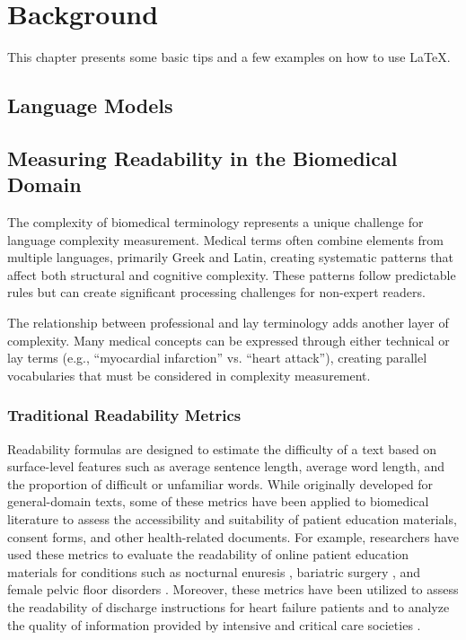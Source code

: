 \chapter{Background}
\label{c2}

This chapter presents some basic tips and a few examples on how to use \LaTeX.


\section{Language Models}
\label{c2:s:language-models}

\section{Measuring Readability in the Biomedical Domain}
\label{c2:s:linguistic-complexity}

The complexity of biomedical terminology represents a unique challenge for language complexity measurement. 
Medical terms often combine elements from multiple languages, primarily Greek and Latin, creating systematic patterns that affect both structural and cognitive complexity. 
These patterns follow predictable rules but can create significant processing challenges for non-expert readers.

The relationship between professional and lay terminology adds another layer of complexity. 
Many medical concepts can be expressed through either technical or lay terms (e.g., ``myocardial infarction'' vs. ``heart attack''), creating parallel vocabularies that must be considered in complexity measurement. 

\subsection{Traditional Readability Metrics}

Readability formulas are designed to estimate the difficulty of a text based on surface-level features such as average sentence length, average word length, and the proportion of difficult or unfamiliar words. While originally developed for general-domain texts, some of these metrics have been applied to biomedical literature to assess the accessibility and suitability of patient education materials, consent forms, and other health-related documents. For example, researchers have used these metrics to evaluate the readability of online patient education materials for conditions such as nocturnal enuresis \cite{Fung2024-uh}, bariatric surgery \cite{Lucy2023-zi}, and female pelvic floor disorders \cite{Varli2023-ma}. Moreover, these metrics have been utilized to assess the readability of discharge instructions for heart failure patients \cite{Tuan2023-wc} and to analyze the quality of information provided by intensive and critical care societies \cite{Hanci2024-wv}.

